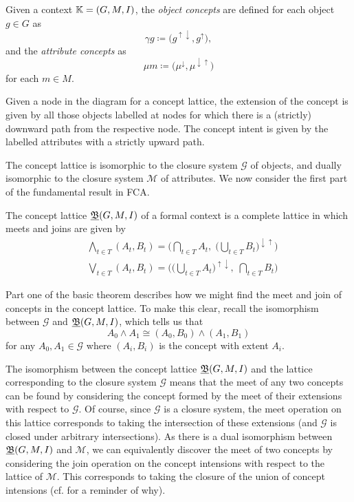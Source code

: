 \begin{definition}
	\label{definition:object-attribute-concepts} 

	Given a context $\mathbb{K} = (G,M,\mathrel{I})$, the \emph{object concepts} are defined for
	each object $g \in G$ as
	\[
		\gamma g \coloneqq \big(g^{\uparrow \downarrow}, g^{\uparrow}\big),
	\]
	and the \emph{attribute concepts} as
	\[
		\mu m \coloneqq \big(\mu^{\downarrow}, \mu^{\downarrow \uparrow}\big)
	\]
	for each $m \in M$.
\end{definition}

Given a node in the diagram for a concept lattice, the extension of the concept is
given by all those objects labelled at nodes for which there is a (strictly) downward
path from the respective node. The concept intent is given by the labelled
attributes with a strictly upward path.

The concept lattice is isomorphic to the closure system $\mathcal{G}$ of objects,
and dually isomorphic to the closure system $\mathcal{M}$ of attributes. We now
consider the first part of the fundamental result in FCA.

\begin{theorem}
	\label{theorem:basic-theorem-part1} The concept lattice $\underline{{\mathfrak B}} (G,M,\mathrel{I})$ of a formal context
	is a complete lattice in which meets and joins are given by
	\begin{align*}
		 & \underset{t \in T}\bigwedge (A_{t}, B_{t}) = \Big( \underset{t \in T}\bigcap A_{t}, \; \big(\underset{t \in T}\bigcup B_{t}\big)^{\downarrow \uparrow}\Big) \\
		 & \underset{t \in T}\bigvee (A_{t}, B_{t}) = \Big( \big(\underset{t \in T}\bigcup A_{t}\big)^{\uparrow \downarrow},\; \underset{t \in T}\bigcap B_{t}\Big)
	\end{align*}
\end{theorem}

Part one of the basic theorem describes how we might find the meet and join of concepts
in the concept lattice. To make this clear, recall the isomorphism between $\mathcal{G}$
and $\underline{{\mathfrak B}} (G,M,\mathrel{I})$, which tells us that
\[
	A_{0}\wedge A_{1}\cong (A_{0},B_{0}) \wedge (A_{1},B_{1})
\]
for any $A_{0},A_{1}\in \mathcal{G}$ where $(A_{i},B_{i})$ is the concept with
extent $A_{i}$.

The isomorphism between the concept lattice $\underline{{\mathfrak B}} (G,M,\mathrel{I})$ and the lattice
corresponding to the closure system $\mathcal{G}$ means that the meet of any two
concepts can be found by considering the concept formed by the meet of their
extensions with respect to $\mathcal{G}$. Of course, since $\mathcal{G}$ is a
closure system, the meet operation on this lattice corresponds to taking the intersection
of these extensions (and $\mathcal{G}$ is closed under arbitrary intersections).
As there is a dual isomorphism between $\underline{{\mathfrak B}} (G,M,\mathrel{I})$ and $\mathcal{M}$, we can equivalently
discover the meet of two concepts by considering the join operation on the concept
intensions with respect to the lattice of $\mathcal{M}$. This corresponds to
taking the closure of the union of concept intensions (cf.
 for a reminder of why).

